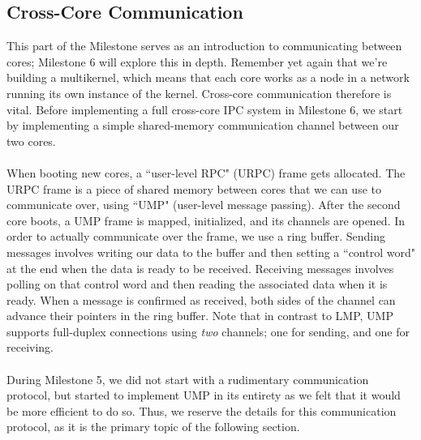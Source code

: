\subsection{Cross-Core Communication}
This part of the Milestone serves as an introduction to communicating between cores; Milestone 6 will explore this in depth. Remember yet again that we're building a multikernel, which means that each core works as a node in a network running its own instance of the kernel. Cross-core communication therefore is vital. Before implementing a full cross-core IPC system in Milestone 6, we start by implementing a simple shared-memory communication channel between our two cores.
\\\\
When booting new cores, a ``user-level RPC" (URPC) frame gets allocated. The URPC frame is a piece of shared memory between cores that we can use to communicate over, using ``UMP" (user-level message passing). After the second core boots, a UMP frame is mapped, initialized, and its channels are opened. In order to actually communicate over the frame, we use a ring buffer. Sending messages involves writing our data to the buffer and then setting a ``control word" at the end when the data is ready to be received. Receiving messages involves polling on that control word and then reading the associated data when it is ready. When a message is confirmed as received, both sides of the channel can advance their pointers in the ring buffer. Note that in contrast to LMP, UMP supports full-duplex connections using \textit{two} channels; one for sending, and one for receiving.
\\\\
During Milestone 5, we did not start with a rudimentary communication protocol, but started to implement UMP in its entirety as we felt that it would be more efficient to do so. Thus, we reserve the details for this communication protocol, as it is the primary topic of the following section. 
